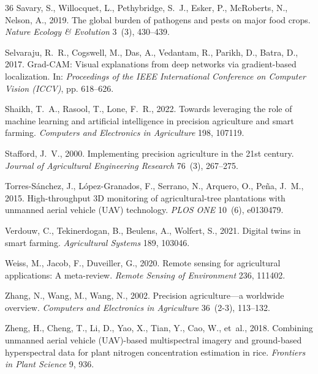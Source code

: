 \documentclass[review,3p,times,authoryear]{elsarticle}
\begin{document}
\begin{thebibliography}{36}
Savary, S., Willocquet, L., Pethybridge, S.~J., Esker, P., McRoberts, N., Nelson, A., 2019.
\newblock The global burden of pathogens and pests on major food crops.
\newblock \emph{Nature Ecology \& Evolution} 3~(3), 430--439.

Selvaraju, R.~R., Cogswell, M., Das, A., Vedantam, R., Parikh, D., Batra, D., 2017.
\newblock Grad-CAM: Visual explanations from deep networks via gradient-based localization.
\newblock In: \emph{Proceedings of the IEEE International Conference on Computer Vision (ICCV)}, pp. 618--626.

Shaikh, T.~A., Rasool, T., Lone, F.~R., 2022.
\newblock Towards leveraging the role of machine learning and artificial intelligence in precision agriculture and smart farming.
\newblock \emph{Computers and Electronics in Agriculture} 198, 107119.

Stafford, J.~V., 2000.
\newblock Implementing precision agriculture in the 21st century.
\newblock \emph{Journal of Agricultural Engineering Research} 76~(3), 267--275.

Torres-S{\'a}nchez, J., L{\'o}pez-Granados, F., Serrano, N., Arquero, O., Pe{\~n}a, J.~M., 2015.
\newblock High-throughput 3D monitoring of agricultural-tree plantations with unmanned aerial vehicle (UAV) technology.
\newblock \emph{PLOS ONE} 10~(6), e0130479.

Verdouw, C., Tekinerdogan, B., Beulens, A., Wolfert, S., 2021.
\newblock Digital twins in smart farming.
\newblock \emph{Agricultural Systems} 189, 103046.

Weiss, M., Jacob, F., Duveiller, G., 2020.
\newblock Remote sensing for agricultural applications: A meta-review.
\newblock \emph{Remote Sensing of Environment} 236, 111402.

Zhang, N., Wang, M., Wang, N., 2002.
\newblock Precision agriculture---a worldwide overview.
\newblock \emph{Computers and Electronics in Agriculture} 36~(2-3), 113--132.

Zheng, H., Cheng, T., Li, D., Yao, X., Tian, Y., Cao, W., et~al., 2018.
\newblock Combining unmanned aerial vehicle (UAV)-based multispectral imagery and ground-based hyperspectral data for plant nitrogen concentration estimation in rice.
\newblock \emph{Frontiers in Plant Science} 9, 936.

\end{thebibliography}
\end{document}
